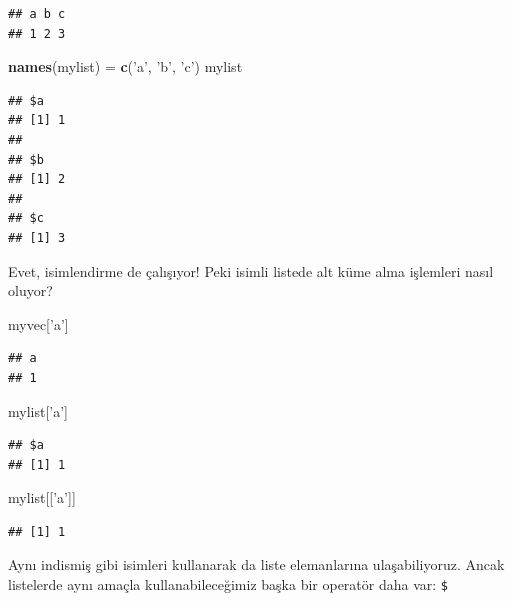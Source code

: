 \documentclass[]{book}
\newenvironment{Shaded}{\begin{snugshade}}{\end{snugshade}}
\newcommand{\KeywordTok}[1]{\textcolor[rgb]{0.13,0.29,0.53}{\textbf{#1}}}
\newcommand{\NormalTok}[1]{#1}
\newcommand{\StringTok}[1]{\textcolor[rgb]{0.31,0.60,0.02}{#1}}
\begin{document}
\begin{verbatim}
## a b c 
## 1 2 3
\end{verbatim}

\begin{Shaded}
\begin{Highlighting}[]
\KeywordTok{names}\NormalTok{(mylist) =}\StringTok{ }\KeywordTok{c}\NormalTok{(}\StringTok{'a'}\NormalTok{, }\StringTok{'b'}\NormalTok{, }\StringTok{'c'}\NormalTok{)}
\NormalTok{mylist}
\end{Highlighting}
\end{Shaded}

\begin{verbatim}
## $a
## [1] 1
## 
## $b
## [1] 2
## 
## $c
## [1] 3
\end{verbatim}

Evet, isimlendirme de çalışıyor! Peki isimli listede alt küme alma
işlemleri nasıl oluyor?

\begin{Shaded}
\begin{Highlighting}[]
\NormalTok{myvec[}\StringTok{'a'}\NormalTok{]}
\end{Highlighting}
\end{Shaded}

\begin{verbatim}
## a 
## 1
\end{verbatim}

\begin{Shaded}
\begin{Highlighting}[]
\NormalTok{mylist[}\StringTok{'a'}\NormalTok{]}
\end{Highlighting}
\end{Shaded}

\begin{verbatim}
## $a
## [1] 1
\end{verbatim}

\begin{Shaded}
\begin{Highlighting}[]
\NormalTok{mylist[[}\StringTok{'a'}\NormalTok{]]}
\end{Highlighting}
\end{Shaded}

\begin{verbatim}
## [1] 1
\end{verbatim}

Aynı indismiş gibi isimleri kullanarak da liste elemanlarına
ulaşabiliyoruz. Ancak listelerde aynı amaçla kullanabileceğimiz başka
bir operatör daha var: \texttt{\$}
\end{document}

